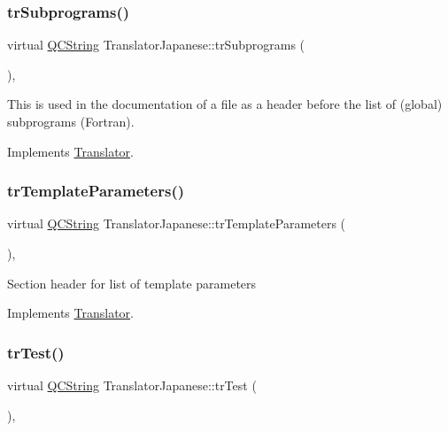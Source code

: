 \subsubsection{\texorpdfstring{trSubprograms()}{trSubprograms()}}
{\footnotesize\ttfamily virtual \mbox{\hyperlink{class_q_c_string}{Q\+C\+String}} Translator\+Japanese\+::tr\+Subprograms (\begin{DoxyParamCaption}{ }\end{DoxyParamCaption})\hspace{0.3cm}{\ttfamily [inline]}, {\ttfamily [virtual]}}

This is used in the documentation of a file as a header before the list of (global) subprograms (Fortran). 

Implements \mbox{\hyperlink{class_translator}{Translator}}.

\mbox{\label{class_translator_japanese_ad7d2c82a4ab7f02e45460179ec188464}} 
\subsubsection{\texorpdfstring{trTemplateParameters()}{trTemplateParameters()}}
{\footnotesize\ttfamily virtual \mbox{\hyperlink{class_q_c_string}{Q\+C\+String}} Translator\+Japanese\+::tr\+Template\+Parameters (\begin{DoxyParamCaption}{ }\end{DoxyParamCaption})\hspace{0.3cm}{\ttfamily [inline]}, {\ttfamily [virtual]}}

Section header for list of template parameters 

Implements \mbox{\hyperlink{class_translator}{Translator}}.

\mbox{\label{class_translator_japanese_a41a3f9a92f3abdccdc791388d040e794}} 
\subsubsection{\texorpdfstring{trTest()}{trTest()}}
{\footnotesize\ttfamily virtual \mbox{\hyperlink{class_q_c_string}{Q\+C\+String}} Translator\+Japanese\+::tr\+Test (\begin{DoxyParamCaption}{ }\end{DoxyParamCaption})\hspace{0.3cm}{\ttfamily [inline]}, {\ttfamily [virtual]}}


